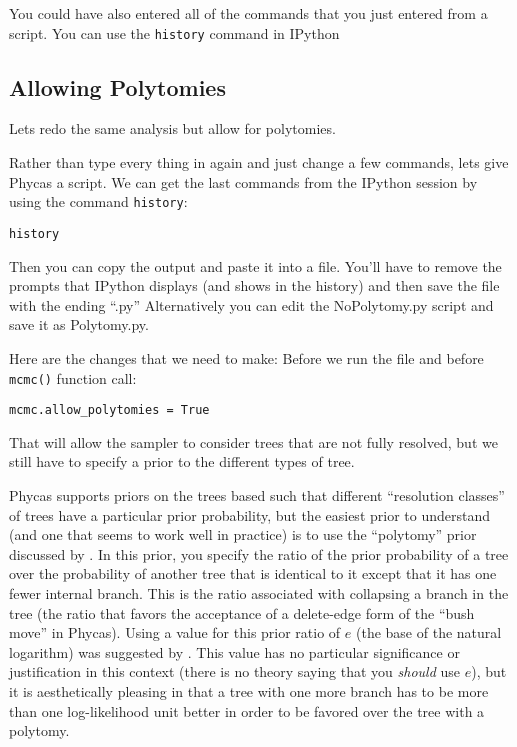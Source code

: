 \documentclass{article}
\newcommand{\cmd}[1]{\texttt{#1}\xspace}
\newcommand{\phycas}{Phycas\xspace}
\newcommand{\localfile}[1]{\textsf{#1}\xspace}
\begin{document}
You could have also entered all of the commands that you just entered from a script. 
You can use the \cmd{history} command in IPython 

\subsection{Allowing Polytomies}
Lets redo the same analysis but allow for polytomies.

Rather than type every thing in again and just change a few commands, lets give \phycas a script.
We can get the last commands from the IPython session by using the command \cmd{history}:
\begin{verbatim}
history
\end{verbatim}
Then you can copy the output and paste it into a file.  
You'll have to remove the prompts that IPython displays (and shows in the history) and then save the file with the ending ``.py''
Alternatively you can edit the \localfile{NoPolytomy.py} script and save it as  \localfile{Polytomy.py}.

Here are the changes that we need to make:
Before we run the file and before \cmd{mcmc()} function call:
\begin{verbatim}
mcmc.allow_polytomies = True
\end{verbatim}
That will allow the sampler to consider trees that are not fully resolved, 
but we still have to specify a prior to the different types of tree.

\phycas supports priors on the trees based such that different ``resolution classes'' of trees have a particular prior probability, but the easiest prior to understand (and one that seems to work well in practice) is to use the ``polytomy'' prior discussed by \citet{LewisHH2005}.
In this prior, you specify the ratio of the prior probability of a tree over the probability of another tree that is identical to it except  that it has one fewer internal branch.
This is the ratio associated with collapsing a branch in the tree (the ratio that favors the 
acceptance of a delete-edge form of the ``bush move'' in \phycas).
Using a value for this prior ratio of $e$ (the base of the natural logarithm) was 
suggested by \citet{LewisHH2005}.
This value has no particular significance or justification in this
context (there is no theory saying that you {\em should} use $e$),
but it is aesthetically pleasing in that a tree with one more
branch has to be more than one log-likelihood unit better in
order to be favored over the tree with a polytomy.
\end{document}
